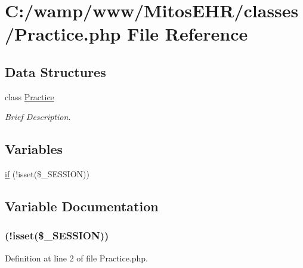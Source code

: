 \hypertarget{_practice_8php}{\section{\-C\-:/wamp/www/\-Mitos\-E\-H\-R/classes/\-Practice.php \-File \-Reference}
\label{_practice_8php}
}
\subsection*{\-Data \-Structures}
\begin{DoxyCompactItemize}
\item 
class \hyperlink{class_practice}{\-Practice}
\begin{DoxyCompactList}\small\item\em \-Brief \-Description. \end{DoxyCompactList}\end{DoxyCompactItemize}
\subsection*{\-Variables}
\begin{DoxyCompactItemize}
\item 
\hyperlink{_practice_8php_a8ceca98aa29914fd2479a84a8d2242fb}{if} (!isset(\$\-\_\-\-S\-E\-S\-S\-I\-O\-N))
\end{DoxyCompactItemize}


\subsection{\-Variable \-Documentation}
\hypertarget{_practice_8php_a8ceca98aa29914fd2479a84a8d2242fb}{
\subsubsection[{if}]{(!isset(\$\-\_\-\-S\-E\-S\-S\-I\-O\-N))}}\label{_practice_8php_a8ceca98aa29914fd2479a84a8d2242fb}


\-Definition at line 2 of file \-Practice.\-php.

